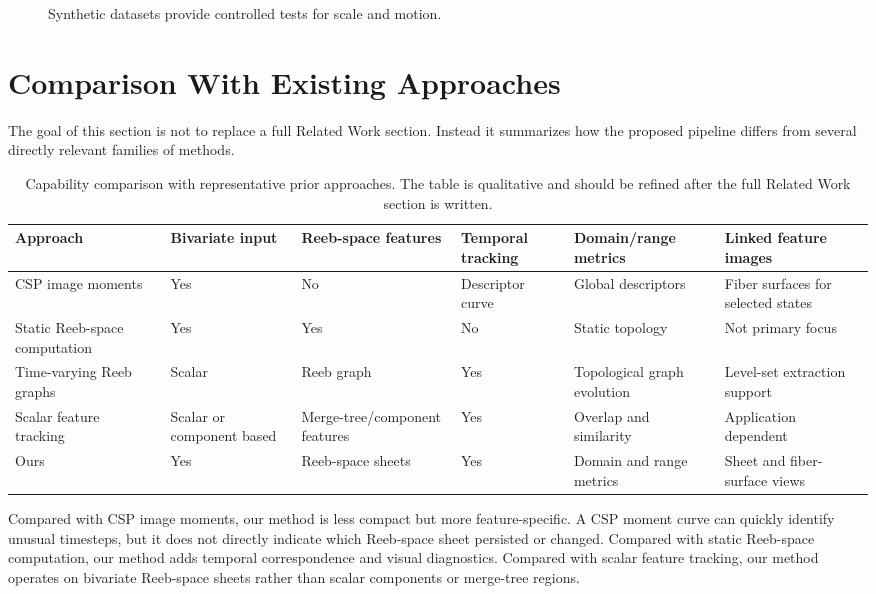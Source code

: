 \begin{figure}[t]
  \caption{Synthetic datasets provide controlled tests for scale and motion.}
  \label{fig:torus-case}
\end{figure}

\section{Comparison With Existing Approaches}

The goal of this section is not to replace a full Related Work section. Instead
it summarizes how the proposed pipeline differs from several directly relevant
families of methods.

\begin{table}[t]
\caption{Capability comparison with representative prior approaches. The table
is qualitative and should be refined after the full Related Work section is
written.}
\label{tab:comparison}
\centering
\begin{tabular}{p{}p{}p{}p{}p{}p{}}
\toprule
Approach & Bivariate input & Reeb-space features & Temporal tracking & Domain/range metrics & Linked feature images \\
\midrule
CSP image moments~\cite{sharma2025csp} & Yes & No & Descriptor curve & Global descriptors & Fiber surfaces for selected states \\
Static Reeb-space computation~\cite{tierny2017jacobi,hristov2026singular} & Yes & Yes & No & Static topology & Not primary focus \\
Time-varying Reeb graphs~\cite{edelsbrunner2008timevarying} & Scalar & Reeb graph & Yes & Topological graph evolution & Level-set extraction support \\
Scalar feature tracking~\cite{saikia2017global,lukasczyk2020dynamic} & Scalar or component based & Merge-tree/component features & Yes & Overlap and similarity & Application dependent \\
Ours & Yes & Reeb-space sheets & Yes & Domain and range metrics & Sheet and fiber-surface views \\
\bottomrule
\end{tabular}
\end{table}

Compared with CSP image moments, our method is less compact but more
feature-specific. A CSP moment curve can quickly identify unusual timesteps, but
it does not directly indicate which Reeb-space sheet persisted or changed.
Compared with static Reeb-space computation, our method adds temporal
correspondence and visual diagnostics. Compared with scalar feature tracking,
our method operates on bivariate Reeb-space sheets rather than scalar
components or merge-tree regions.

